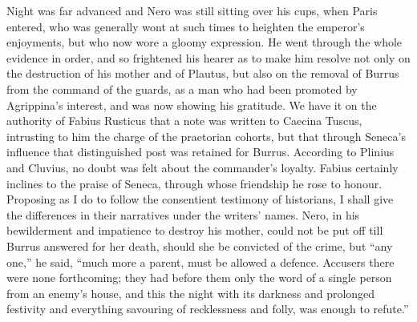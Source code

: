 
Night was far advanced and Nero was still sitting over his cups, when Paris entered, who was generally wont at such times to heighten the emperor's enjoyments, but who now wore a gloomy expression. He went through the whole evidence in order, and so frightened his hearer as to make him resolve not only on the destruction of his mother and of Plautus, but also on the removal of Burrus from the command of the guards, as a man who had been promoted by Agrippina's interest, and was now showing his gratitude. We have it on the authority of Fabius Rusticus that a note was written to Caecina Tuscus, intrusting to him the charge of the praetorian cohorts, but that through Seneca's influence that distinguished post was retained for Burrus. According to Plinius and Cluvius, no doubt was felt about the commander's loyalty. Fabius certainly inclines to the praise of Seneca, through whose friendship he rose to honour. Proposing as I do to follow the consentient testimony of historians, I shall give the differences in their narratives under the writers' names. Nero, in his bewilderment and impatience to destroy his mother, could not be put off till Burrus answered for her death, should she be convicted of the crime, but ``any one,'' he said, ``much more a parent, must be allowed a defence. Accusers there were none forthcoming; they had before them only the word of a single person from an enemy's house, and this the night with its darkness and prolonged festivity and everything savouring of recklessness and folly, was enough to refute.''


